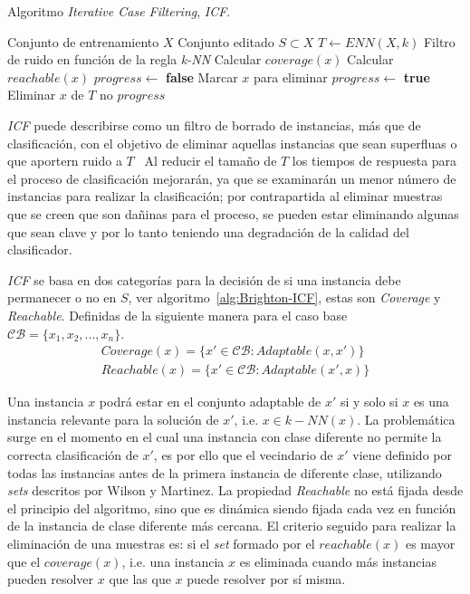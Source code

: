 \begin{algorithm}[H]
\caption{Algoritmo \textit{Iterative Case Filtering}, \textit{ICF}.}\label{alg:Brighton-ICF}
\begin{algorithmic}[1]
\Require Conjunto de entrenamiento $X$
\Ensure Conjunto editado $S \subset X$
\Statex
{}	
	\State $T \leftarrow ENN(X,k)$ \Comment Filtro de ruido en función de la regla \textit{k-NN}
	\Repeat
			\State Calcular $coverage(x)$
			\State Calcular $reachable(x)$		
		\EndFor
		\State $progress \leftarrow$ \textbf{false}
				\State Marcar $x$ para eliminar
				\State $progress \leftarrow $ \textbf{true}
			\EndIf
		\EndFor
			\State Eliminar $x$ de $T$
		\EndFor
	\Until no $progress$
\EndProcedure
\end{algorithmic}
\end{algorithm}

\textit{ICF} puede describirse como un filtro de borrado de instancias, más que de clasificación, con el objetivo de eliminar aquellas instancias que sean superfluas o que aportern ruido a $T$~\cite{brighton2002advances} Al reducir el tamaño de $T$ los tiempos de respuesta para el proceso de clasificación mejorarán, ya que se examinarán un menor número de instancias para realizar la clasificación; por contrapartida al eliminar muestras que se creen que son dañinas para el proceso, se pueden estar eliminando algunas que sean clave y por lo tanto teniendo una degradación de la calidad del clasificador.

\textit{ICF} se basa en dos categorías para la decisión de si una instancia debe permanecer o no en $S$, ver algoritmo~\ref{alg:Brighton-ICF}, estas son \textit{Coverage} y \textit{Reachable}. Definidas de la siguiente manera para el caso base $\mathcal{CB} = \lbrace x_1, x_2, ..., x_n\rbrace$.
\begin{align*}
Coverage (x) = \lbrace x' \in \mathcal{CB} : Adaptable(x, x')\rbrace  \\
Reachable (x) = \lbrace x' \in \mathcal{CB} : Adaptable(x',x)\rbrace
\end{align*}

Una instancia $x$ podrá estar en el conjunto adaptable de $x'$ si y solo si $x$ es una instancia relevante para la solución de $x'$, i.e. $x \in k-NN(x)$. La problemática surge en el momento en el cual una instancia con clase diferente no permite la correcta clasificación de $x'$, es por ello que el vecindario de $x'$ viene definido por todas las instancias antes de la primera instancia de diferente clase, utilizando \textit{sets} descritos por Wilson y Martinez. La propiedad \textit{Reachable} no está fijada desde el principio del algoritmo, sino que es dinámica siendo fijada cada vez en función de la instancia de clase diferente más cercana. El criterio seguido para realizar la eliminación de una muestras es: si el \textit{set} formado por el $reachable(x)$ es mayor que el $coverage(x)$, i.e. una instancia $x$ es eliminada cuando más instancias pueden resolver $x$ que las que $x$ puede resolver por sí misma.


